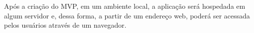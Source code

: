 \documentclass[
	12pt,				%
	openright,			%
	oneside,			%
	a4paper,			%
	english,			%
	brazil				%
	]{abntex2}
\begin{document}
Após a criação do MVP, em um ambiente local, a aplicação será hospedada em algum servidor e, dessa forma, a partir de um endereço web, poderá ser acessada pelos usuários através de um navegador. 













\end{document}
